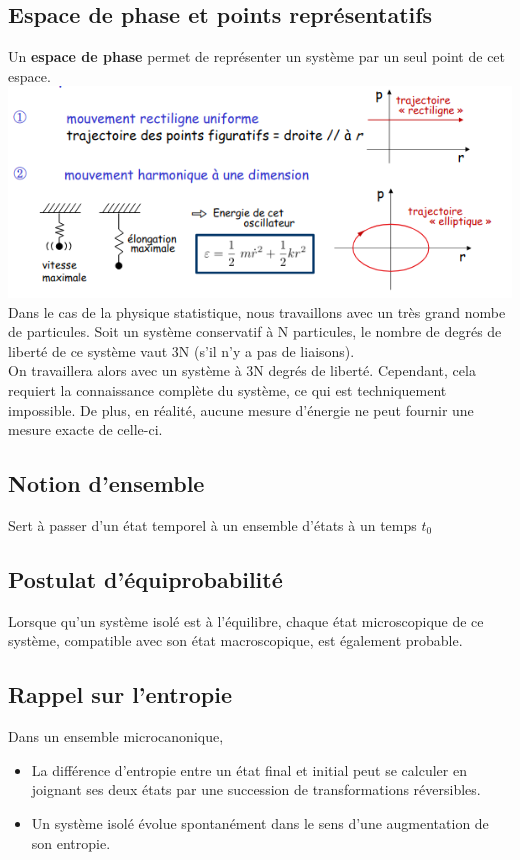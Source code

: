 \documentclass{article}
\begin{document}
        \subsection{Espace de phase et points représentatifs}
            Un \textbf{espace de phase} permet de représenter un système par un seul point de cet espace. \\
            \includegraphics[scale=.5]{espace_de_phase_exs.png} \\
            Dans le cas de la physique statistique, nous travaillons avec un très grand nombe de particules.
            Soit un système conservatif à N particules, le nombre de degrés de liberté de ce système vaut 3N (s’il n’y a pas de liaisons). \\
            On travaillera alors avec un système à 3N degrés de liberté.
            Cependant, cela requiert la connaissance complète du système, ce qui est techniquement impossible.
            De plus, en réalité, aucune mesure d'énergie ne peut fournir une mesure exacte de celle-ci.
        
        \subsection{Notion d'ensemble}
            Sert à passer d'un état temporel à un ensemble d'états à un temps $t_0$

        \subsection{Postulat d'équiprobabilité}
            Lorsque qu’un système isolé est à l’équilibre, chaque état microscopique
            de ce système, compatible avec son état macroscopique, est également probable.
        
        \subsection{Rappel sur l'entropie}
            Dans un ensemble microcanonique, %
            \begin{itemize}
                \item La différence d'entropie entre un état final et initial peut se calculer en joignant ses deux états par une succession de transformations réversibles.
                \item Un système isolé évolue spontanément dans le sens d'une augmentation de son entropie.
            \end{itemize}
            
\end{document}
